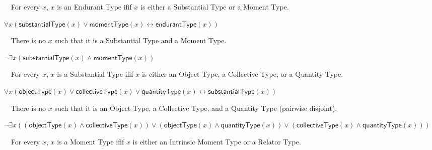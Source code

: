 \documentclass{article}
\newcommand{\AxLabel}{a}
\newcounter{cntax}
\newcommand{\myax}[1]{\refstepcounter{cntax}{\bf \small \AxLabel\thecntax}\label{#1}$\,\,\,\,$}
\newcommand{\me}[1]{\textsf{#1}}
\begin{document}
\begin{itemize}
    \item[\myax{ax_endurantType_taxonomy_nature}] For every $x$, $x$ is an \me{Endurant Type} ifif $x$ is either a \me{Substantial Type} or a \me{Moment Type}.
    
    $\forall x(\textsf{substantialType}(x)\vee \textsf{momentType}(x)\leftrightarrow \textsf{endurantType}(x))$
    
    
    
    
    \item[\myax{ax_endurantType_partition_nature}] There is no $x$ such that it is a \me{Substantial Type} and a \me{Moment Type}.
    
    $\neg \exists x(\textsf{substantialType}(x)\wedge \textsf{momentType}(x))$
    
    


    \item[\myax{ax_substantialType_taxonomy}] For every $x$, $x$ is a \me{Substantial Type} ifif $x$ is either an \me{Object Type}, a \me{Collective Type}, or a \me{Quantity Type}.
    
    $\forall x(\textsf{objectType}(x)\vee \textsf{collectiveType}(x)\vee \textsf{quantityType}(x)\leftrightarrow \textsf{substantialType}(x))$
    
    
    

    \item[\myax{ax_substantialType_partition}] There is no $x$ such that it is an \me{Object Type}, a \me{Collective Type}, and a \me{Quantity Type} (pairwise disjoint).
    
    $\neg \exists x((\textsf{objectType}(x)\wedge \textsf{collectiveType}(x))\vee (\textsf{objectType}(x)\wedge \textsf{quantityType}(x))\vee (\textsf{collectiveType}(x)\wedge \textsf{quantityType}(x)))$
    
    

    \item[\myax{ax_momentType_taxonomy}] For every $x$, $x$ is a \me{Moment Type} ifif $x$ is either an \me{Intrinsic Moment Type} or a \me{Relator Type}.
    

\end{itemize}
\end{document}
